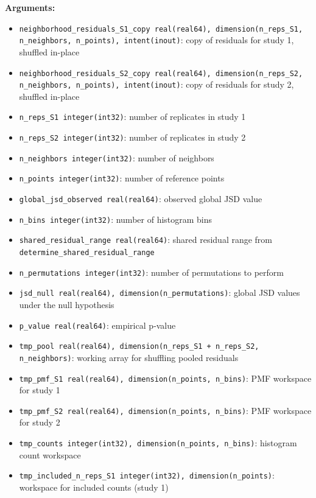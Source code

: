 \begin{enumerate}
        \textbf{Arguments:}
        \begin{itemize}
            \item \lstinline!neighborhood_residuals_S1_copy real(real64), dimension(n_reps_S1, n_neighbors, n_points), intent(inout)!: copy of residuals for study 1, shuffled in-place
            \item \lstinline!neighborhood_residuals_S2_copy real(real64), dimension(n_reps_S2, n_neighbors, n_points), intent(inout)!: copy of residuals for study 2, shuffled in-place
            \item \lstinline!n_reps_S1 integer(int32)!: number of replicates in study 1
            \item \lstinline!n_reps_S2 integer(int32)!: number of replicates in study 2
            \item \lstinline!n_neighbors integer(int32)!: number of neighbors
            \item \lstinline!n_points integer(int32)!: number of reference points
            \item \lstinline!global_jsd_observed real(real64)!: observed global JSD value
            \item \lstinline!n_bins integer(int32)!: number of histogram bins
            \item \lstinline!shared_residual_range real(real64)!: shared residual range from \lstinline!determine_shared_residual_range!
            \item \lstinline!n_permutations integer(int32)!: number of permutations to perform
            \item \lstinline!jsd_null real(real64), dimension(n_permutations)!: global JSD values under the null hypothesis
            \item \lstinline!p_value real(real64)!: empirical p‑value
            \item \lstinline!tmp_pool real(real64), dimension(n_reps_S1 + n_reps_S2, n_neighbors)!: working array for shuffling pooled residuals
            \item \lstinline!tmp_pmf_S1 real(real64), dimension(n_points, n_bins)!: PMF workspace for study 1
            \item \lstinline!tmp_pmf_S2 real(real64), dimension(n_points, n_bins)!: PMF workspace for study 2
            \item \lstinline!tmp_counts integer(int32), dimension(n_points, n_bins)!: histogram count workspace
            \item \lstinline!tmp_included_n_reps_S1 integer(int32), dimension(n_points)!: workspace for included counts (study 1)

\end{itemize}
\end{enumerate}
